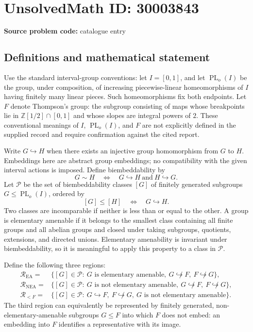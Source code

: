 \documentclass[11pt]{article}
\newcommand{\Z}{\mathbb{Z}}
\begin{document}
\section*{UnsolvedMath ID: 30003843}
\textbf{Source problem code:} catalogue entry
\subsection{Definitions and mathematical statement}
Use the standard interval-group conventions: let \(I=[0,1]\), and let \(\operatorname{PL}_o(I)\) be the group, under composition, of increasing piecewise-linear homeomorphisms of \(I\) having finitely many linear pieces. Such homeomorphisms fix both endpoints. Let \(F\) denote Thompson's group: the subgroup consisting of maps whose breakpoints lie in \(\Z[1/2]\cap[0,1]\) and whose slopes are integral powers of \(2\). These conventional meanings of \(I\), \(\operatorname{PL}_o(I)\), and \(F\) are not explicitly defined in the supplied record and require confirmation against the cited report.

Write \(G\hookrightarrow H\) when there exists an injective group homomorphism from \(G\) to \(H\). Embeddings here are abstract group embeddings; no compatibility with the given interval actions is imposed. Define biembeddability by
\[
G\sim H\quad\Longleftrightarrow\quad G\hookrightarrow H\ \text{and}\ H\hookrightarrow G.
\]
Let \(\mathcal P\) be the set of biembeddability classes \([G]\) of finitely generated subgroups \(G\leq\operatorname{PL}_o(I)\), ordered by
\[
[G]\leq[H]\quad\Longleftrightarrow\quad G\hookrightarrow H.
\]
Two classes are incomparable if neither is less than or equal to the other. A group is elementary amenable if it belongs to the smallest class containing all finite groups and all abelian groups and closed under taking subgroups, quotients, extensions, and directed unions. Elementary amenability is invariant under biembeddability, so it is meaningful to apply this property to a class in \(\mathcal P\).

Define the following three regions:
\begin{align*}
\mathcal R_{\mathrm{EA}}={}&\{[G]\in\mathcal P:\ G\text{ is elementary amenable},\ G\not\hookrightarrow F,\ F\not\hookrightarrow G\},\\
\mathcal R_{\mathrm{NEA}}={}&\{[G]\in\mathcal P:\ G\text{ is not elementary amenable},\ G\not\hookrightarrow F,\ F\not\hookrightarrow G\},\\
\mathcal R_{<F}={}&\{[G]\in\mathcal P:\ G\hookrightarrow F,\ F\not\hookrightarrow G,\ G\text{ is not elementary amenable}\}.
\end{align*}
The third region can equivalently be represented by finitely generated, non-elementary-amenable subgroups \(G\leq F\) into which \(F\) does not embed: an embedding into \(F\) identifies a representative with its image.
\end{document}
